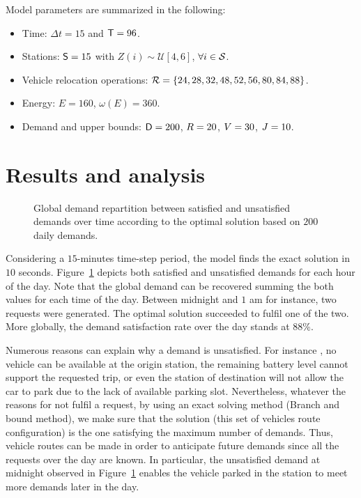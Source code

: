\begin{bibunit}[ieeetr]
\medskip\noindent
Model parameters are summarized in the following:
\begin{itemize}
\item Time: $\Delta t = 15$ and $\mathsf{T} = 96$.
\item Stations: $\mathsf{S} = 15$ with $Z(i) \sim \mathcal{U}[4,6]$, $\forall i \in \mathcal{S}$.
\item Vehicle relocation operations: $\mathcal{R} = \{24, 28, 32 ,48, 52, 56, 80, 84, 88\}$.
\item Energy: $E = 160$, $\omega (E) = 360$.
\item Demand and upper bounds: $\mathsf{D} = 200$, $R = 20$, $V = 30$,  $J = 10$.
\end{itemize}


\section{Results and analysis} \label{sec:energyExp:results}

\begin{figure}[t]
\flushleft

\caption{Global demand repartition between satisfied and unsatisfied demands over time according to the optimal solution based on $200$ daily demands.}
\label{fig:plotDemand}
\end{figure}

\medskip
Considering a $15$-minutes time-step period, the model finds the exact solution in $10$ seconds.
Figure~\ref{fig:plotDemand} depicts both satisfied and unsatisfied demands for each hour of the day.
Note that the global demand can be recovered summing the both values for each time of the day.
Between midnight and $1$ am for instance, two requests were generated.
The optimal solution succeeded to fulfil one of the two.
More globally, the demand satisfaction rate over the day stands at $88$\%.

\medskip
Numerous reasons can explain why a demand is unsatisfied.
For instance , no vehicle can be available at the origin station, the remaining battery level cannot support the requested trip, or even the station of destination will not allow the car to park due to the lack of available parking slot.
Nevertheless, whatever the reasons for not fulfil a request, by using an exact solving method (Branch and bound method), we make sure that the solution (\ie this set of vehicles route configuration) is the one satisfying the maximum number of demands.
Thus, vehicle routes can be made in order to anticipate future demands since all the requests over the day are known.
In particular, the unsatisfied demand at midnight observed in Figure~\ref{fig:plotDemand} enables the vehicle parked in the station to meet more demands later in the day.


\end{bibunit}
